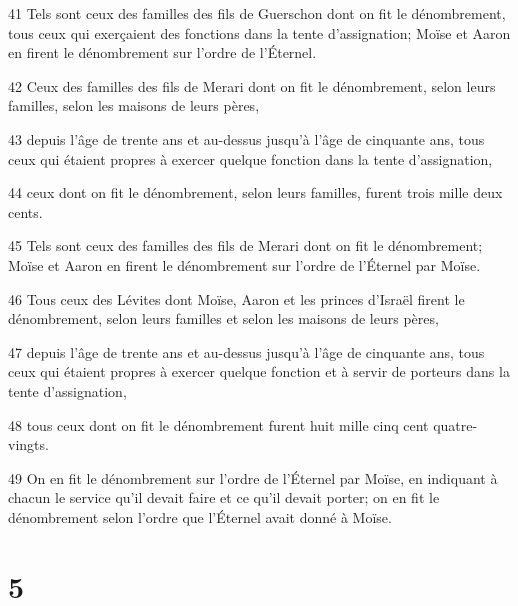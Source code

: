 \par 41 Tels sont ceux des familles des fils de Guerschon dont on fit le dénombrement, tous ceux qui exerçaient des fonctions dans la tente d'assignation; Moïse et Aaron en firent le dénombrement sur l'ordre de l'Éternel.
\par 42 Ceux des familles des fils de Merari dont on fit le dénombrement, selon leurs familles, selon les maisons de leurs pères,
\par 43 depuis l'âge de trente ans et au-dessus jusqu'à l'âge de cinquante ans, tous ceux qui étaient propres à exercer quelque fonction dans la tente d'assignation,
\par 44 ceux dont on fit le dénombrement, selon leurs familles, furent trois mille deux cents.
\par 45 Tels sont ceux des familles des fils de Merari dont on fit le dénombrement; Moïse et Aaron en firent le dénombrement sur l'ordre de l'Éternel par Moïse.
\par 46 Tous ceux des Lévites dont Moïse, Aaron et les princes d'Israël firent le dénombrement, selon leurs familles et selon les maisons de leurs pères,
\par 47 depuis l'âge de trente ans et au-dessus jusqu'à l'âge de cinquante ans, tous ceux qui étaient propres à exercer quelque fonction et à servir de porteurs dans la tente d'assignation,
\par 48 tous ceux dont on fit le dénombrement furent huit mille cinq cent quatre-vingts.
\par 49 On en fit le dénombrement sur l'ordre de l'Éternel par Moïse, en indiquant à chacun le service qu'il devait faire et ce qu'il devait porter; on en fit le dénombrement selon l'ordre que l'Éternel avait donné à Moïse.

\chapter{5}

